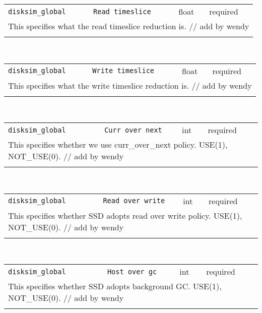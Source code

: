 \noindent 
\begin{tabular}{|p{\lpmodwidth}|p{\lpnamewidth}|p{0.5in}|p{0.5in}|}
\cline{1-4}
\texttt{disksim\_global} & \texttt{Read timeslice} & float & required \\ 
\cline{1-4}
\multicolumn{4}{|p{6in}|}{
This specifies what the read timeslice reduction is. // add by wendy
}\\ 
\cline{1-4}
\multicolumn{4}{p{5in}}{}\\
\end{tabular}\\ 
\noindent 
\begin{tabular}{|p{\lpmodwidth}|p{\lpnamewidth}|p{0.5in}|p{0.5in}|}
\cline{1-4}
\texttt{disksim\_global} & \texttt{Write timeslice} & float & required \\ 
\cline{1-4}
\multicolumn{4}{|p{6in}|}{
This specifies what the write timeslice reduction is. // add by wendy
}\\ 
\cline{1-4}
\multicolumn{4}{p{5in}}{}\\
\end{tabular}\\ 
\noindent 
\begin{tabular}{|p{\lpmodwidth}|p{\lpnamewidth}|p{0.5in}|p{0.5in}|}
\cline{1-4}
\texttt{disksim\_global} & \texttt{Curr over next} & int & required \\ 
\cline{1-4}
\multicolumn{4}{|p{6in}|}{
This specifies whether we use curr_over_next policy. USE(1), NOT_USE(0). // add by wendy
}\\ 
\cline{1-4}
\multicolumn{4}{p{5in}}{}\\
\end{tabular}\\ 
\noindent 
\begin{tabular}{|p{\lpmodwidth}|p{\lpnamewidth}|p{0.5in}|p{0.5in}|}
\cline{1-4}
\texttt{disksim\_global} & \texttt{Read over write} & int & required \\ 
\cline{1-4}
\multicolumn{4}{|p{6in}|}{
This specifies whether SSD adopts read over write policy. USE(1), NOT_USE(0). // add by wendy
}\\ 
\cline{1-4}
\multicolumn{4}{p{5in}}{}\\
\end{tabular}\\ 
\noindent 
\begin{tabular}{|p{\lpmodwidth}|p{\lpnamewidth}|p{0.5in}|p{0.5in}|}
\cline{1-4}
\texttt{disksim\_global} & \texttt{Host over gc} & int & required \\ 
\cline{1-4}
\multicolumn{4}{|p{6in}|}{
This specifies whether SSD adopts background GC. USE(1), NOT_USE(0). // add by wendy
}\\ 
\cline{1-4}
\multicolumn{4}{p{5in}}{}\\
\end{tabular}\\ 
